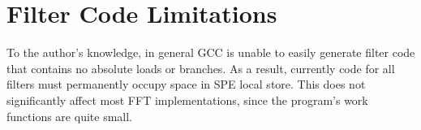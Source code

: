 \section{Filter Code Limitations}

To the author's knowledge, in general GCC is unable to easily generate filter code that contains no absolute loads or branches. As a result, currently code for all filters must permanently occupy space in SPE local store. This does not significantly affect most FFT implementations, since the program's work functions are quite small.
